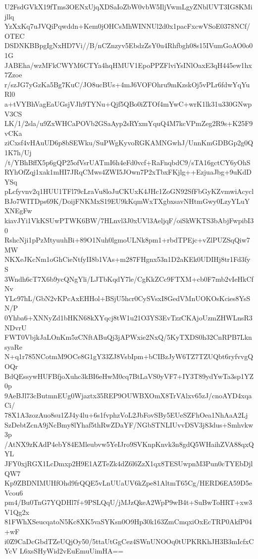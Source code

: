 U2FsdGVkX19fTms3OENxUjqXDSaIoZbW0vbW5IljVwmLgyZNblUVT3IG8KMijllq
YzXxKq7uJVQiPqwddn+Kem0jOHCsMhWINNUl2d0x1pacFxcwVSoE0378NCf/OTEC
DSDNKBBpgIgNxHD7Vi//B/nCZnzyv5EbdzZsY0u4Rhfbgh08s15IVumGoAO0o01G
JABEha/wzMFkCWYM6CTYa4hqHMUV1EpoPPZFlviYsINlOaxE3qH445ew1hx7Zzoe
r/szJG7yGzKa5Bg7KuC/JO8ucBUs+4mJ6VOFOhru9mKzskOj5vPLr6fdwYqYuRl0
a+tVYBhVagEaUGsjVJh9TYNu+Qjf5QBo0iZTOf4mYwC+wrK1lk31u330GNwpV3CS
LK/1/2sla/u9ZxWHCaPOVb2GSaAyp2sRYxmYquQ4M7kcVPmZeg2R9s+K25F9vCKa
ziCxsf4vHAuUD6p8bSEWku/SuPWgKyvoRGKAMNGwhJ/UnnKmGDBGp2g0Q1K7h/Uj
/t/YBhBffX5p6gQP25ofVsrUATmI6h4eFd0vcf+RaFnqbdC9/sTA16gctCY6yOhS
RYhOfZqj1xak1mHI7JRqCMws4ZWI5JOwn7P2xTbxFKjlg++EzjuaJbg+9uKdDYSq
pLcfyvnv2q1HUU1TFl79cLraVu8loJuCKUxK4JHc1ZoGN92SfFbGyKZvmwiAcycl
BJo7WITDps69K/DoijFNKMxS19EU9kKqmWxTXgbxsavNHtmGwy0LzyYLuYXNEgFw
kiavJYi1VkKSUwPTWK6BW/7HLnvl3J0xUVl3AeljqF/oiSkWKTS3bAbjFwpibI30
RshcNji1pPzMtyuuhBi+89O1Nuh0lgmoULNk8pm1+rbdTPEjc+vZlPUZSqQiw7MW
NKXeJKcNm1oGhCieNtfyII8b1VAs+m287FHgnx53n1D2aKEk0UDIHj8tr1Fd3fyS
3Wndh6cT7X6b9ycQNgYli/LJTbKqdY7le/CgKkZCc9FTXM+cb0F7mb2vIeHkCfNv
YLc97hL/GbN2vKPcAxEHHol+BSjU5hcr0CySVsxI8GedVMnUOKOsKcies8YsSN/P
0Yhba6+XNNyZd1bHKN68kXYqcj8tW1u21O3YS3EvTzzCKAjoUzmZHWLnsR3NDvrU
FWT0VbjkJaLOnKm5zCNftABuQj3jAPWxie2NxQ/5KyTXDS0h32CnRPB7LknsyaRe
N+q1r785NCotmM9OCe8G1gY33ZJ8VsbIpm+bCIBzJyW6TZ7TZUQbt6ryfvvgQOQr
BdQEssywHUFBfjoXuhc3kBI6eHwM0cq7BtLaVS0yVF7+IY3T89ydYwTa3sp1YZ0p
9AeBJl73cButmnEUg0Wjaztx35REP9OUWBXOmX8TrVAlxv65zJ/cnoAYD4xqaCi/
78X1A3zozAuo8su1ZJ4y4lu+6s1fvphzVoL2JbFovSBy5EUeSZFhOea1NhAaA2Lj
SzDebtZcnA9jNcBmy8lYhaf5thRwZDaYF/NGbSTNLIUvvDSV3j83dus+Smhvkw3p
/AtNX9zKAdP4ebY84EMleubvw5YeIJro9SVKnpKnvk3n8gdQ5WHaihZVA88qxQYL
JFY0xjRGX1LcDmxp2H9E1AZTeZk4dZ6l6ZzX1qx8TESUwpnM3Pun0cTYEbDjlQW7
Kp9ZBDNIMUHfOhd9frQQE5vLnUUaUV6kZpe81AltmT65Cg/HERD6EA59D5eVcou6
pm4/Bu0TnG7YQDHl7f+9PSLQqU/jMJzQkeA2WpP9wB4t+SuBwToHRT+xw3V1Qg2x
81FWhXSeucqatoN5Kc8XK5vaSYKsn0O9Hp30k163ZmCmqxiOxEcTRP0AkfP04+wF
i0Z9CaDcGbdTZeUQjOy50/5ttaUtGgCez4SWnUNOOq0tUPKRKhJH3B3mIcfxCYcV
L6xsSHyWid2vEuEmuUimHA==
